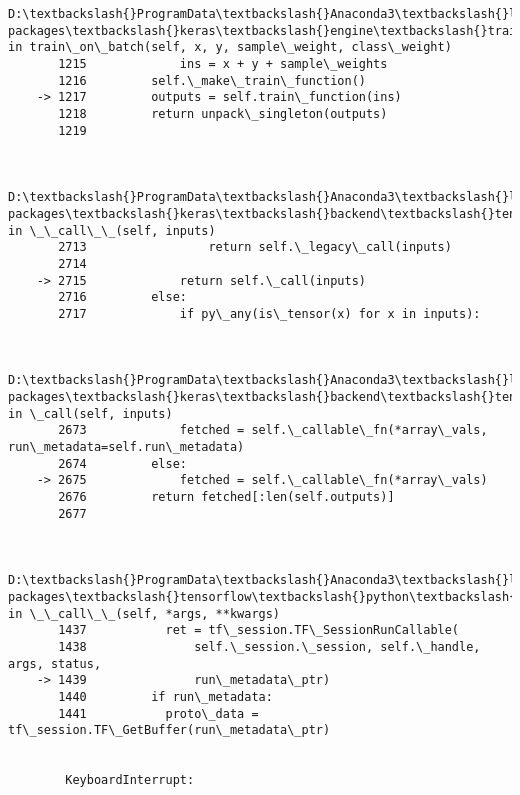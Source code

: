 \documentclass[11pt]{article}
\begin{document}
\begin{Verbatim}[commandchars=\\\{\}]
        D:\textbackslash{}ProgramData\textbackslash{}Anaconda3\textbackslash{}lib\textbackslash{}site-packages\textbackslash{}keras\textbackslash{}engine\textbackslash{}training.py in train\_on\_batch(self, x, y, sample\_weight, class\_weight)
       1215             ins = x + y + sample\_weights
       1216         self.\_make\_train\_function()
    -> 1217         outputs = self.train\_function(ins)
       1218         return unpack\_singleton(outputs)
       1219 
    

        D:\textbackslash{}ProgramData\textbackslash{}Anaconda3\textbackslash{}lib\textbackslash{}site-packages\textbackslash{}keras\textbackslash{}backend\textbackslash{}tensorflow\_backend.py in \_\_call\_\_(self, inputs)
       2713                 return self.\_legacy\_call(inputs)
       2714 
    -> 2715             return self.\_call(inputs)
       2716         else:
       2717             if py\_any(is\_tensor(x) for x in inputs):
    

        D:\textbackslash{}ProgramData\textbackslash{}Anaconda3\textbackslash{}lib\textbackslash{}site-packages\textbackslash{}keras\textbackslash{}backend\textbackslash{}tensorflow\_backend.py in \_call(self, inputs)
       2673             fetched = self.\_callable\_fn(*array\_vals, run\_metadata=self.run\_metadata)
       2674         else:
    -> 2675             fetched = self.\_callable\_fn(*array\_vals)
       2676         return fetched[:len(self.outputs)]
       2677 
    

        D:\textbackslash{}ProgramData\textbackslash{}Anaconda3\textbackslash{}lib\textbackslash{}site-packages\textbackslash{}tensorflow\textbackslash{}python\textbackslash{}client\textbackslash{}session.py in \_\_call\_\_(self, *args, **kwargs)
       1437           ret = tf\_session.TF\_SessionRunCallable(
       1438               self.\_session.\_session, self.\_handle, args, status,
    -> 1439               run\_metadata\_ptr)
       1440         if run\_metadata:
       1441           proto\_data = tf\_session.TF\_GetBuffer(run\_metadata\_ptr)
    

        KeyboardInterrupt: 

    \end{Verbatim}


    
    
    
    
\end{document}
